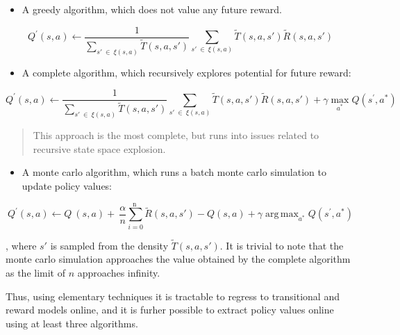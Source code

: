 \documentclass[compsoc,journal,letterpaper,10pt,draftclsnofoot,onecolumn]{IEEEtran}
\DeclareMathOperator*{\argmax}{arg\,max}
\begin{document}
\begin{itemize}
\item
  A greedy algorithm, which does not value any future reward.
\end{itemize}

\begin{equation}
Q^{'}(s,a) \leftarrow \frac{1}{\sum_{s'\  \in \ \xi(s,a)}^{\ }{\tilde{T}\left( s,a,s' \right)}}\sum_{s'\  \in \ \xi(s,a)}^{\ }{\tilde{T}\left( s,a,s' \right)\tilde{R}\left( s,a,s' \right)}
\end{equation} 

\begin{itemize}
\item
  A complete algorithm, which recursively explores potential for future
  reward:
\end{itemize}

 
\begin{equation}
Q^{'}(s,a) \leftarrow \frac{1}{\sum_{s'\  \in \ \xi(s,a)} {\tilde{T}\left( s,a,s' \right)}}\sum_{s'\  \in \ \xi(s,a)}^{\ }{\tilde{T}\left( s,a,s' \right)\tilde{R}\left( s,a,s' \right) + \gamma\max_{a^{*}}Q(s^{'},a^{*})}
\end{equation}

 

\begin{quote}
This approach is the most complete, but runs into issues related to
recursive state space explosion.
\end{quote}

\begin{itemize}
\item
  A monte carlo algorithm, which runs a batch monte carlo simulation to
  update policy values:
\end{itemize}
 
\begin{equation}
Q^{'}\left( s,a \right) \leftarrow Q^{\ }\left( s,a \right) + \ \frac{\alpha}{n}\sum_{i = 0}^{\text{n\ }}{\tilde{R}\left( s,a,s' \right) - Q \left( s,a \right) + \gamma\argmax_{a^{*}}{Q(s^{'},a^{*})}}
\end{equation}
 
, where \(s'\) is sampled from the density
\(\tilde{T}\left( s,a,s' \right)\). It is trivial to note that the monte
carlo simulation approaches the value obtained by the complete algorithm
as the limit of \(n\) approaches infinity.

Thus, using elementary techniques it is tractable to regress to
transitional and reward models online, and it is furher possible to
extract policy values online using at least three algorithms.
\end{document}

